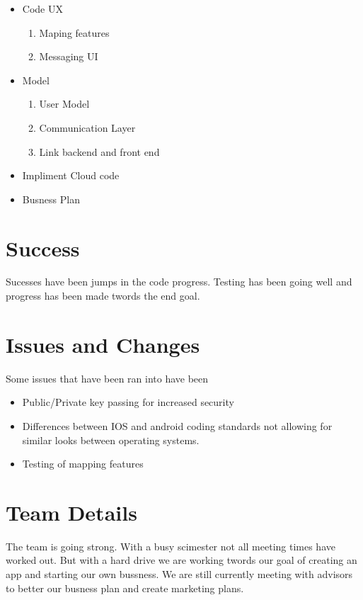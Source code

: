\documentclass[11pt]{article}
\begin{document}
	\begin{itemize}
	\item Code UX
		\begin{enumerate}
		\item Maping features
		\item Messaging UI
		\end{enumerate}
	\item Model
		\begin{enumerate}
		\item User Model
		\item Communication Layer
		\item Link backend and front end
		\end{enumerate}
	\item Impliment Cloud code
	\item Busness Plan

	\end{itemize}

\section*{Success}
Sucesses have been jumps in the code progress. Testing has been going well and progress has been made twords the end goal. 


\section*{Issues and Changes}
Some issues that have been ran into have been

	\begin{itemize}
	\item Public/Private key passing for increased security
	\item Differences between IOS and android coding standards not allowing for similar looks between operating systems.
	\item Testing of mapping features 
	\end{itemize}




	
\section*{Team Details}
The team is going strong. With a busy scimester not all meeting times have worked out. But with a hard drive we are working twords our goal of creating an app and starting our own bussness. We are still currently meeting with advisors to better our busness plan and create marketing plans.
\end{document}
